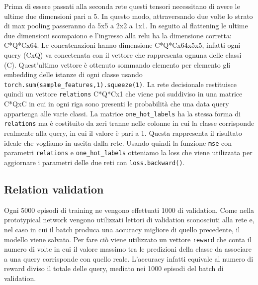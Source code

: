 \documentclass[12pt,a4paper,titlepage]{article}
\begin{document}
Prima di essere passati alla seconda rete questi tensori necessitano di avere le ultime due dimensioni pari a 5.
In questo modo, attraversando due volte lo strato di max pooling passeranno da 5x5 a 2x2 a 1x1.
In seguito al flattening le ultime due dimensioni scompaiono e l'ingresso alla relu ha la dimensione corretta: C*Q*Cx64.
Le concatenazioni hanno dimensione C*Q*Cx64x5x5, infatti ogni query (CxQ) va concetenata con il vettore che rappresenta ognuna delle classi (C).
Quest'ultimo vettore è ottenuto sommando elemento per elemento gli embedding delle istanze di ogni classe usando \texttt{torch.sum(sample\_features,1).squeeze(1)}.
La rete decisionale restituisce quindi un vettore \texttt{relations} C*Q*Cx1 che viene poi suddiviso in una matrice C*QxC in cui in ogni riga sono presenti le probabilità che una data query appartenga alle varie classi.
La matrice \texttt{one\_hot\_labels} ha la stessa forma di \texttt{relations} ma è costituito da zeri tranne nelle colonne in cui la classe corrisponde realmente alla query, in cui il valore è pari a 1.
Questa rappresenta il risultato ideale che vogliamo in uscita dalla rete.
Usando quindi la funzione \texttt{mse} con parametri \texttt{relations} e \texttt{one\_hot\_labels} otteniamo la loss che viene utilizzata per aggiornare i parametri delle due reti con \texttt{loss.backward()}.
\subsection{Relation validation}
Ogni 5000 episodi di training ne vengono effettuati 1000 di validation.
Come nella prototypical network vengono utilizzati lettori di validation sconosciuti alla rete e, nel caso in cui il batch produca una accuracy migliore di quello precedente, il modello viene salvato.
Per fare ciò viene utilizzato un vettore \texttt{reward} che conta il numero di volte in cui il valore massimo tra le predizioni della classe da associare a una query corrisponde con quello reale.
L'accuracy infatti equivale al numero di reward diviso il totale delle query, mediato nei 1000 episodi del batch di validation.
\end{document}
